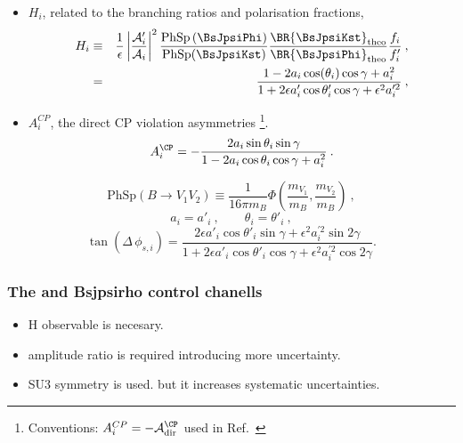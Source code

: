 \begin{itemize}
\item $H_i$, related to the branching ratios and polarisation fractions,
\begin{eqnarray}\label{Eq:Hobs_Vector}
H_i & \equiv &  \frac{1}{\epsilon} \left|\frac{\mathcal{A}'_i}{\mathcal{A}_i}\right|^2
\frac{\text{PhSp}\left(\BsJpsiPhi\right)}{\text{PhSp}(\BsJpsiKst)}
\frac{\BR{\BsJpsiKst}_{\text{theo}}}{\BR{\BsJpsiPhi}_{\text{theo}}}
\frac{f_i}{f'_i}\:,  \\
  & = & \frac{1-2a_i \cos(\theta_i) \cos\gamma+a_i^{2}}{1+2\epsilon a'_i \cos\theta'_i\cos\gamma +\epsilon^2 a_i^{\prime 2}} \:, \nonumber
\end{eqnarray}
\item $A^{CP}_i$, the direct CP violation asymmetries%
\footnote{Conventions: $A^{CP}_i = -\mathcal{A}_{\text{dir}}^{\CP}$ used in Ref.~\cite{DeBruyn:2014oga}}.
\begin{equation}\label{eq:ACPpeng}
A^{\CP}_i= -\frac{2a_i\sin\theta_i\sin\gamma}{1-2a_i\cos\theta_i\cos\gamma+a_i^{2}}\:.
\end{equation}
\end{itemize}
\begin{equation}
\text{PhSp}(B\to V_1V_2) \equiv \frac{1}{16\pi m_B}\Phi\left(\frac{m_{V_1}}{m_B}, \frac{m_{V_2}}{m_B}\right)\:,
\end{equation}
\begin{equation}\label{Eq:penguin_relation}
a_i = a'_i\:,\qquad \theta_i = \theta'_i\:,
\end{equation}
\begin{equation}\label{tandelta}
\tan(\Delta\,\phi_{s,i}) = \frac{2\epsilon a'_i \cos\theta'_i \sin\gamma+\epsilon^2 a^{\prime 2}_i \sin2\gamma}{1+2\epsilon a'_i \cos\theta'_i \cos\gamma+ \epsilon^2 a^{\prime 2}_i \cos2\gamma}.
\end{equation}



\subsubsection{The \BsJpsiKst and Bsjpsirho control chanells}

\begin{itemize}
  \item H observable is necesary.
  \item amplitude ratio is required introducing more uncertainty.
  \item SU3 symmetry is used. but it increases systematic uncertainties.
\end{itemize}

